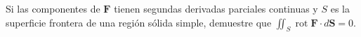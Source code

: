 \item Si las componentes de $\mathbf{F}$ tienen segundas derivadas parciales continuas y $S$ es la superficie frontera de una región sólida simple, demuestre que $\iint_S \operatorname{rot} \mathbf{F} \cdot d\mathbf{S} = 0$.
